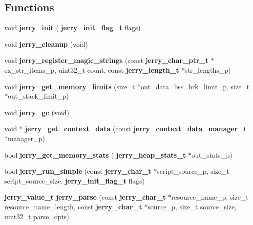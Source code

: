 \subsection*{Functions}
\begin{DoxyCompactItemize}
\item 
void \textbf{ jerry\+\_\+init} (\textbf{ jerry\+\_\+init\+\_\+flag\+\_\+t} flags)
\item 
\mbox{\label{group___core_gad74a7a58c00f4592efaddd379df15434}} 
void {\bfseries jerry\+\_\+cleanup} (void)
\item 
\mbox{\label{group___core_ga487ecd0a120178a463061eafeddd7035}} 
void {\bfseries jerry\+\_\+register\+\_\+magic\+\_\+strings} (const \textbf{ jerry\+\_\+char\+\_\+ptr\+\_\+t} $\ast$ex\+\_\+str\+\_\+items\+\_\+p, uint32\+\_\+t count, const \textbf{ jerry\+\_\+length\+\_\+t} $\ast$str\+\_\+lengths\+\_\+p)
\item 
\mbox{\label{group___core_ga95ce9e15e5d2f7dfa4c3db28c5bebabc}} 
void {\bfseries jerry\+\_\+get\+\_\+memory\+\_\+limits} (size\+\_\+t $\ast$out\+\_\+data\+\_\+bss\+\_\+brk\+\_\+limit\+\_\+p, size\+\_\+t $\ast$out\+\_\+stack\+\_\+limit\+\_\+p)
\item 
\mbox{\label{group___core_ga4fbde7f18b806417819fa7fdb637feff}} 
void {\bfseries jerry\+\_\+gc} (void)
\item 
\mbox{\label{group___core_gaa6092ccd332de3a2f798d41d3ca284da}} 
void $\ast$ {\bfseries jerry\+\_\+get\+\_\+context\+\_\+data} (const \textbf{ jerry\+\_\+context\+\_\+data\+\_\+manager\+\_\+t} $\ast$manager\+\_\+p)
\item 
\mbox{\label{group___core_gaaefa805fc373fa26354ee548992351ed}} 
bool {\bfseries jerry\+\_\+get\+\_\+memory\+\_\+stats} (\textbf{ jerry\+\_\+heap\+\_\+stats\+\_\+t} $\ast$out\+\_\+stats\+\_\+p)
\item 
bool \textbf{ jerry\+\_\+run\+\_\+simple} (const \textbf{ jerry\+\_\+char\+\_\+t} $\ast$script\+\_\+source\+\_\+p, size\+\_\+t script\+\_\+source\+\_\+size, \textbf{ jerry\+\_\+init\+\_\+flag\+\_\+t} flags)
\item 
\mbox{\label{group___core_ga42d924159905de2645ed4d0169153a89}} 
\textbf{ jerry\+\_\+value\+\_\+t} {\bfseries jerry\+\_\+parse} (const \textbf{ jerry\+\_\+char\+\_\+t} $\ast$resource\+\_\+name\+\_\+p, size\+\_\+t resource\+\_\+name\+\_\+length, const \textbf{ jerry\+\_\+char\+\_\+t} $\ast$source\+\_\+p, size\+\_\+t source\+\_\+size, uint32\+\_\+t parse\+\_\+opts)
\item 
\mbox{\label{group___core_ga8fd1b401ee93edf7342598d624e9b53e}} 

\end{DoxyCompactItemize}
